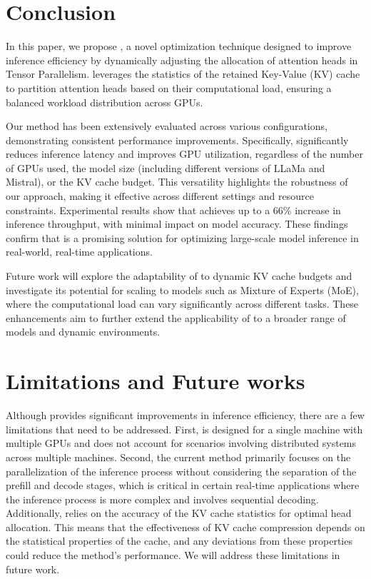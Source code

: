 \section{Conclusion}

In this paper, we propose \textit{\AlgName{}}, a novel optimization technique designed to improve inference efficiency by dynamically adjusting the allocation of attention heads in Tensor Parallelism. \AlgName{} leverages the statistics of the retained Key-Value (KV) cache to partition attention heads based on their computational load, ensuring a balanced workload distribution across GPUs.

Our method has been extensively evaluated across various configurations, demonstrating consistent performance improvements. Specifically, \AlgName{} significantly reduces inference latency and improves GPU utilization, regardless of the number of GPUs used, the model size (including different versions of LLaMa and Mistral), or the KV cache budget. This versatility highlights the robustness of our approach, making it effective across different settings and resource constraints. Experimental results show that \AlgName{} achieves up to a 66\% increase in inference throughput, with minimal impact on model accuracy. These findings confirm that \AlgName{} is a promising solution for optimizing large-scale model inference in real-world, real-time applications.

Future work will explore the adaptability of \AlgName{} to dynamic KV cache budgets and investigate its potential for scaling to models such as Mixture of Experts (MoE), where the computational load can vary significantly across different tasks. These enhancements aim to further extend the applicability of \AlgName{} to a broader range of models and dynamic environments.


\section{Limitations and Future works}

Although \textit{\AlgName{}} provides significant improvements in inference efficiency, there are a few limitations that need to be addressed. First, \AlgName{} is designed for a single machine with multiple GPUs and does not account for scenarios involving distributed systems across multiple machines. Second, the current method primarily focuses on the parallelization of the inference process without considering the separation of the prefill and decode stages, which is critical in certain real-time applications where the inference process is more complex and involves sequential decoding. 
Additionally, \AlgName{} relies on the accuracy of the KV cache statistics for optimal head allocation. This means that the effectiveness of KV cache compression depends on the statistical properties of the cache, and any deviations from these properties could reduce the method’s performance. We will address these limitations in future work.
